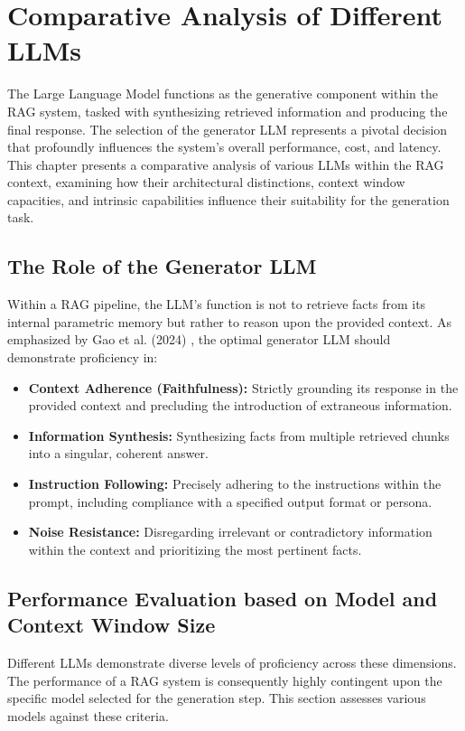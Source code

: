 \chapter{Comparative Analysis of Different LLMs}
\label{chap:llm_comparison}

The Large Language Model functions as the generative component within the RAG system, tasked with synthesizing retrieved information and producing the final response. The selection of the generator LLM represents a pivotal decision that profoundly influences the system's overall performance, cost, and latency. This chapter presents a comparative analysis of various LLMs within the RAG context, examining how their architectural distinctions, context window capacities, and intrinsic capabilities influence their suitability for the generation task.

\section{The Role of the Generator LLM}
Within a RAG pipeline, the LLM's function is not to retrieve facts from its internal parametric memory but rather to reason upon the provided context. As emphasized by Gao et al. (2024) \autocite{gao2024retrievalaugmentedgenerationlargelanguage}, the optimal generator LLM should demonstrate proficiency in:
\begin{itemize}
    \item \textbf{Context Adherence (Faithfulness):} Strictly grounding its response in the provided context and precluding the introduction of extraneous information.
    \item \textbf{Information Synthesis:} Synthesizing facts from multiple retrieved chunks into a singular, coherent answer.
    \item \textbf{Instruction Following:} Precisely adhering to the instructions within the prompt, including compliance with a specified output format or persona.
    \item \textbf{Noise Resistance:} Disregarding irrelevant or contradictory information within the context and prioritizing the most pertinent facts.
\end{itemize}

\section{Performance Evaluation based on Model and Context Window Size}
Different LLMs demonstrate diverse levels of proficiency across these dimensions. The performance of a RAG system is consequently highly contingent upon the specific model selected for the generation step. This section assesses various models against these criteria.

